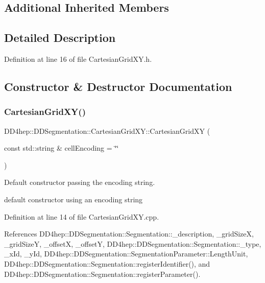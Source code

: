 \subsection*{Additional Inherited Members}


\subsection{Detailed Description}


Definition at line 16 of file Cartesian\+Grid\+X\+Y.\+h.



\subsection{Constructor \& Destructor Documentation}
\hypertarget{class_d_d4hep_1_1_d_d_segmentation_1_1_cartesian_grid_x_y_a7fe8b00de8abcee4e8cbfc71b8ee6c32}{}\label{class_d_d4hep_1_1_d_d_segmentation_1_1_cartesian_grid_x_y_a7fe8b00de8abcee4e8cbfc71b8ee6c32} 
\subsubsection{\texorpdfstring{Cartesian\+Grid\+X\+Y()}{CartesianGridXY()}\hspace{0.1cm}{\footnotesize\ttfamily [1/2]}}
{\footnotesize\ttfamily D\+D4hep\+::\+D\+D\+Segmentation\+::\+Cartesian\+Grid\+X\+Y\+::\+Cartesian\+Grid\+XY (\begin{DoxyParamCaption}\item[{const std\+::string \&}]{cell\+Encoding = {\ttfamily \char`\"{}\char`\"{}} }\end{DoxyParamCaption})}



Default constructor passing the encoding string. 

default constructor using an encoding string 

Definition at line 14 of file Cartesian\+Grid\+X\+Y.\+cpp.



References D\+D4hep\+::\+D\+D\+Segmentation\+::\+Segmentation\+::\+\_\+description, \+\_\+grid\+SizeX, \+\_\+grid\+SizeY, \+\_\+offsetX, \+\_\+offsetY, D\+D4hep\+::\+D\+D\+Segmentation\+::\+Segmentation\+::\+\_\+type, \+\_\+x\+Id, \+\_\+y\+Id, D\+D4hep\+::\+D\+D\+Segmentation\+::\+Segmentation\+Parameter\+::\+Length\+Unit, D\+D4hep\+::\+D\+D\+Segmentation\+::\+Segmentation\+::register\+Identifier(), and D\+D4hep\+::\+D\+D\+Segmentation\+::\+Segmentation\+::register\+Parameter().

